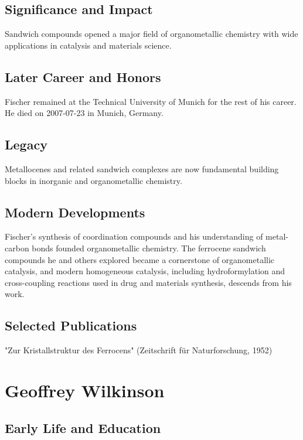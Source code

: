 \subsection*{Significance and Impact}

Sandwich compounds opened a major field of organometallic chemistry with wide applications in catalysis and materials science.

\subsection*{Later Career and Honors}

Fischer remained at the Technical University of Munich for the rest of his career. He died on 2007-07-23 in Munich, Germany.

\subsection*{Legacy}

Metallocenes and related sandwich complexes are now fundamental building blocks in inorganic and organometallic chemistry.

\subsection*{Modern Developments}

Fischer's synthesis of coordination compounds and his understanding of metal-carbon bonds founded organometallic chemistry. The ferrocene sandwich compounds he and others explored became a cornerstone of organometallic catalysis, and modern homogeneous catalysis, including hydroformylation and cross-coupling reactions used in drug and materials synthesis, descends from his work.

\subsection*{Selected Publications}

"Zur Kristallstruktur des Ferrocens" (Zeitschrift für Naturforschung, 1952)

\clearpage

\section{Geoffrey Wilkinson}

\subsection*{Early Life and Education}

